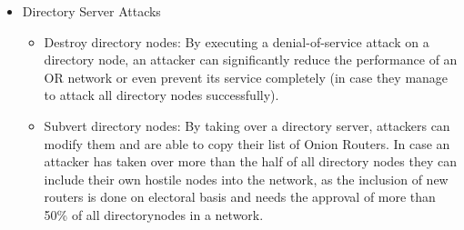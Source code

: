 \documentclass{sig-alternate}
\begin{document}
\begin{description}
\begin{itemize}
\begin{itemize}
		\end{itemize}
		\item Directory Server Attacks
			\begin{itemize} \itemsep0pt 
			\item Destroy directory nodes: By executing a denial-of-service attack on a directory node, an attacker can significantly reduce the performance of an OR network or even prevent its service completely (in case they manage to attack all directory nodes successfully).
			\item Subvert directory nodes: By taking over a directory server, attackers can modify them and are able to copy their list of Onion Routers. In case an attacker has taken over more than the half of all directory nodes they can include their own hostile nodes into the network, as the inclusion of new routers is done on electoral basis and needs the approval of more than 50\% of all directorynodes in a network.
		\end{itemize}
	\end{itemize}
\end{description}
\end{document}

